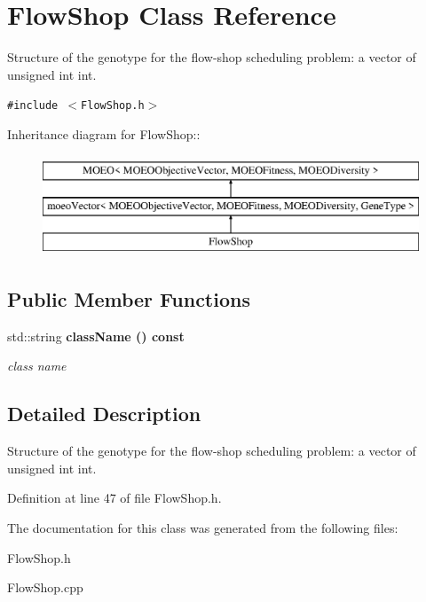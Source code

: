 \section{Flow\-Shop Class Reference}
\label{classFlowShop}
Structure of the genotype for the flow-shop scheduling problem: a vector of unsigned int int.  


{\tt \#include $<$Flow\-Shop.h$>$}

Inheritance diagram for Flow\-Shop::\begin{figure}[H]
\begin{center}
\leavevmode
\includegraphics[height=3cm]{classFlowShop}
\end{center}
\end{figure}
\subsection*{Public Member Functions}
\begin{CompactItemize}
\item 
std::string \bf{class\-Name} () const \label{classFlowShop_eaab263664f0078082e723a905d430f3}

\begin{CompactList}\small\item\em class name \item\end{CompactList}\end{CompactItemize}


\subsection{Detailed Description}
Structure of the genotype for the flow-shop scheduling problem: a vector of unsigned int int. 



Definition at line 47 of file Flow\-Shop.h.

The documentation for this class was generated from the following files:\begin{CompactItemize}
\item 
Flow\-Shop.h\item 
Flow\-Shop.cpp\end{CompactItemize}

